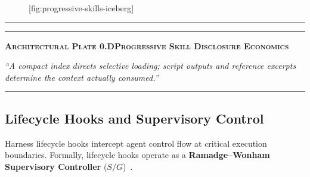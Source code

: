 \begin{figure}[tp]
  \centering
  [fig:progressive-skills-iceberg]
\end{figure}

\vspace{10pt}
\noindent\begin{minipage}{\linewidth}
  \centering
  \par\vspace{8pt}%
  {\color{pdcobalt}\rule{\linewidth}{1.2pt}}\par\vspace{5pt}%
  \raggedright
  {\color{pdswissred}\rule{4.5pt}{4.5pt}}\enspace%
  {\pdgrotesk\bfseries\scshape\fontsize{9}{11}\selectfont\color{hhink}%
    Architectural Plate 0.D\enspace\textperiodcentered\enspace Progressive Skill Disclosure Economics}\par\vspace{4pt}%
  {\pdgrotesk\itshape\fontsize{9.5}{13}\selectfont\color{hhink}%
    ``A compact index directs selective loading; script outputs and reference excerpts determine the context actually consumed.''}\par\vspace{6pt}%
  {\color{hhgray!30}\rule{\linewidth}{0.4pt}}
\end{minipage}
\vspace{10pt}

\subsection{Lifecycle Hooks and Supervisory Control}

Harness lifecycle hooks intercept agent control flow at critical execution boundaries. Formally, lifecycle hooks operate as a \textbf{Ramadge--Wonham Supervisory Controller} ($S / G$)~.


